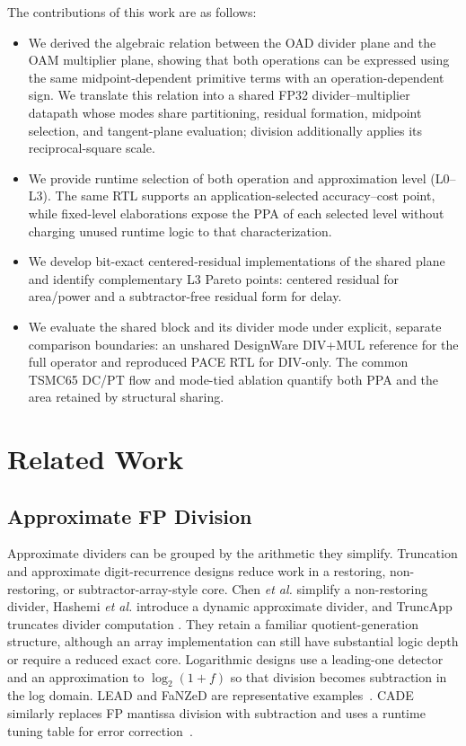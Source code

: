 \documentclass[conference]{IEEEtran}
\begin{document}
The contributions of this work are as follows:
\begin{itemize}
  \item We derived the algebraic relation between the OAD divider plane
  and the OAM multiplier plane, showing that both operations can be expressed
  using the same midpoint-dependent primitive terms with an operation-dependent
  sign. We translate this relation into a shared FP32 divider--multiplier
  datapath whose modes share partitioning, residual formation, midpoint
  selection, and tangent-plane evaluation; division additionally applies its
  reciprocal-square scale.

  \item We provide runtime selection of both operation and approximation level
  (L0--L3). The same RTL supports an application-selected accuracy--cost point,
  while fixed-level elaborations expose the PPA of each selected level without
  charging unused runtime logic to that characterization.

  \item We develop bit-exact centered-residual implementations of the shared
  plane and identify complementary L3 Pareto points: centered residual for
  area/power and a subtractor-free residual form for delay.

  \item We evaluate the shared block and its divider mode under explicit,
  separate comparison boundaries: an unshared DesignWare DIV+MUL reference for
  the full operator and reproduced PACE RTL for DIV-only. The common TSMC65
  DC/PT flow and mode-tied ablation quantify both PPA and the area retained by
  structural sharing.
\end{itemize}
\section{Related Work}
\subsection{Approximate FP Division}
Approximate dividers can be grouped by the arithmetic they simplify.
Truncation and approximate digit-recurrence designs reduce work in a restoring,
non-restoring, or subtractor-array-style core. Chen \emph{et al.} simplify a
non-restoring divider, Hashemi \emph{et al.} introduce a dynamic approximate
divider, and TruncApp truncates divider computation
\cite{chen2015nonrestoring,hashemi2016dynamic,vahdat2017truncapp}. They retain
a familiar quotient-generation structure, although an array implementation can
still have substantial logic depth or require a reduced exact core. Logarithmic
designs use a leading-one detector and an approximation to $\log_2(1+f)$ so
that division becomes subtraction in the log domain. LEAD and FaNZeD are
representative examples~\cite{ratnaparkhi2022lead,saadat2019fanzed}. CADE
similarly replaces FP mantissa division with subtraction and uses a runtime
tuning table for error correction~\cite{imani2019cade}.
\end{document}
